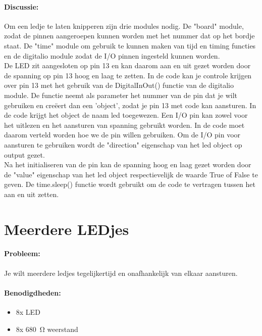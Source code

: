 	\paragraph{Discussie:}  Om een ledje te laten knipperen zijn drie modules nodig. De "board" module, zodat de pinnen aangeroepen kunnen worden met het nummer dat op het bordje staat. De "time" module om gebruik te kunnen maken van tijd en timing functies en de digitalio module zodat de I/O pinnen ingesteld kunnen worden. \\
	
	De LED zit aangesloten op pin 13 en kan daarom aan en uit gezet worden door de spanning op pin 13 hoog en laag te zetten. In de code kan je controle krijgen over pin 13 met het gebruik van de DigitalInOut() functie van de digitalio module. De functie neemt als parameter het nummer van de pin dat je wilt gebruiken en cre\"eert dan een 'object', zodat je pin 13 met code kan aansturen. In de code krijgt het object de naam led toegewezen. Een I/O pin kan zowel voor het uitlezen en het aansturen van spanning gebruikt worden. In de code moet daarom verteld worden hoe we de pin willen gebruiken. Om de I/O pin voor aansturen te gebruiken wordt de "direction" eigenschap van het led object op output gezet.\\
	
	Na het initialiseren van de pin kan de spanning hoog en laag gezet worden door de "value" eigenschap van het led object respectievelijk de waarde True of False te geven. De time.sleep() functie wordt gebruikt om de code te vertragen tussen het aan en uit zetten.
	
\newpage
\section{Meerdere LEDjes}\label{sec:meerdereLedjes}
	\paragraph{Probleem:} Je wilt meerdere ledjes tegelijkertijd en onafhankelijk van elkaar aansturen.
	\paragraph{Benodigdheden:}
		\begin{itemize}
			\item 8x LED
			\item 8x \SI{680}{\ohm} weerstand
		\end{itemize}
